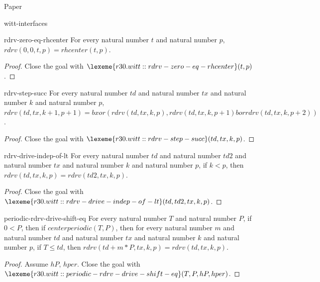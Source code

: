 \begin{lexlean}{Paper}
\begin{section}{witt-interfaces}
  \begin{theorem}{rdrv-zero-eq-rhcenter}
  For every natural number \(t\) and natural number \(p\), \(rdrv(0, 0, t, p) = rhcenter(t, p)\).
  \begin{proof}
  Close the goal with \(\lexeme{r30.witt::rdrv-zero-eq-rhcenter}(t, p)\).
  \end{proof}
  \end{theorem}

  \begin{theorem}{rdrv-step-succ}
  For every natural number \(td\) and natural number \(tx\) and natural number \(k\) and natural number \(p\), \(rdrv(td, tx, k + 1, p + 1) = bxor(rdrv(td, tx, k, p), rdrv(td, tx, k, p + 1) bor rdrv(td, tx, k, p + 2))\).
  \begin{proof}
  Close the goal with \(\lexeme{r30.witt::rdrv-step-succ}(td, tx, k, p)\).
  \end{proof}
  \end{theorem}

  \begin{theorem}{rdrv-drive-indep-of-lt}
  For every natural number \(td\) and natural number \(td2\) and natural number \(tx\) and natural number \(k\) and natural number \(p\), if \(k < p\), then \(rdrv(td, tx, k, p) = rdrv(td2, tx, k, p)\).
  \begin{proof}
  Close the goal with \(\lexeme{r30.witt::rdrv-drive-indep-of-lt}(td, td2, tx, k, p)\).
  \end{proof}
  \end{theorem}

  \begin{theorem}{periodic-rdrv-drive-shift-eq}
  For every natural number \(T\) and natural number \(P\), if \(0 < P\), then if \(centerperiodic(T, P)\), then for every natural number \(m\) and natural number \(td\) and natural number \(tx\) and natural number \(k\) and natural number \(p\), if \(T ≤ td\), then \(rdrv(td + m * P, tx, k, p) = rdrv(td, tx, k, p)\).
  \begin{proof}
  Assume \(hP\), \(hper\).
  Close the goal with \(\lexeme{r30.witt::periodic-rdrv-drive-shift-eq}(T, P, hP, hper)\).
  \end{proof}
  \end{theorem}


\end{section}
\end{lexlean}
